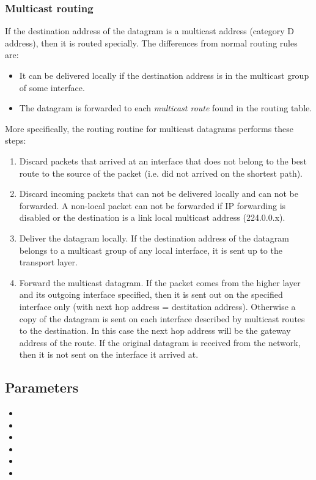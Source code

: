 \subsubsection*{Multicast routing}

If the destination address of the datagram is a multicast address (category D address),
then it is routed specially. The differences from normal routing rules are:
\begin{itemize}
  \item It can be delivered locally if the destination address
  is in the multicast group of some interface.
  \item The datagram is forwarded to each \emph{multicast route}
  found in the routing table.
\end{itemize}

More specifically, the routing routine for multicast datagrams performs these steps:
\begin{enumerate}
  \item Discard packets that arrived at an interface that does not belong
  to the best route to the source of the packet (i.e. did not arrived on the 
  shortest path).
  \item Discard incoming packets that can not be delivered locally and
  can not be forwarded.
  A non-local packet can not be forwarded if IP forwarding is disabled or the
  destination is a link local multicast address (224.0.0.x).
  \item Deliver the datagram locally. If the destination address of the
  datagram belongs to a multicast group of any local interface, it is sent
  up to the transport layer.
  \item Forward the multicast datagram. If the packet comes from the
  higher layer and its outgoing interface specified, then it is sent out
  on the specified interface only (with next hop address = destitation address).
  Otherwise a copy of the datagram is sent on each interface described by
  multicast routes to the destination. In this case the next hop address will be
  the gateway address of the route. If the original datagram is received
  from the network, then it is not sent on the interface it arrived at.
\end{enumerate}
        

\subsection{Parameters}

\begin{itemize}
  \item {}
  \item {}
  \item {}
  \item {}
  \item {}
  \item {}
\end{itemize}

